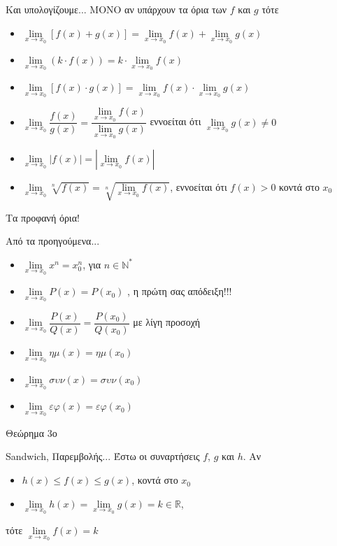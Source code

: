 \documentclass{presentation}
\begin{document}
\begin{frame}{Και υπολογίζουμε...}
  ΜΟΝΟ αν υπάρχουν τα όρια των $f$ και $g$ τότε
  \begin{itemize}
    \item $\lim\limits_{x \to x_0}{ \left[ f(x)+g(x) \right] }=\lim\limits_{x \to x_0}{ f(x) }+\lim\limits_{x \to x_0}{ g(x) }$
    \item $\lim\limits_{x \to x_0}{ \left( k\cdot f(x) \right) }=k\cdot \lim\limits_{x \to x_0}{ f(x) }$
    \item $\lim\limits_{x \to x_0}{ \left[ f(x)\cdot g(x) \right]}=\lim\limits_{x \to x_0}{ f(x) }\cdot\lim\limits_{x \to x_0}{ g(x) }$
    \item $\lim\limits_{x \to x_0}{ \dfrac{f(x)}{g(x)} }=\dfrac{\lim\limits_{x \to x_0}{ f(x) }}{\lim\limits_{x \to x_0}{ g(x) }}$ εννοείται ότι $\lim\limits_{x \to x_0}{ g(x) }\ne 0$
    \item $\lim\limits_{x \to x_0}{ |f(x)| }=|\lim\limits_{x \to x_0}{ f(x) }|$
    \item $\lim\limits_{x \to x_0}{ \sqrt[n]{f(x)} }=\sqrt[n]{\lim\limits_{x \to x_0}{ f(x) }}$, εννοείται ότι $f(x)>0$ κοντά στο $x_0$
  \end{itemize}
\end{frame}

\begin{frame}{Τα προφανή όρια!}
  \begin{block}{Από τα προηγούμενα...}
    \begin{itemize}
      \item $\lim\limits_{x \to x_0}{ x^n }=x_0^n$, για $n\in \mathbb{N}^*$ \pause
      \item $\lim\limits_{x \to x_0}{ P(x) }=P(x_0)$ \pause, η πρώτη σας απόδειξη!!! \pause
      \item $\lim\limits_{x \to x_0}{ \dfrac{P(x)}{Q(x)} }=\dfrac{P(x_0)}{Q(x_0)}$ \pause με λίγη προσοχή \pause
      \item $\lim\limits_{x \to x_0}{ ημ(x) }=ημ(x_0)$ \pause
      \item $\lim\limits_{x \to x_0}{ συν(x) }=συν(x_0)$ \pause
      \item $\lim\limits_{x \to x_0}{ εφ(x) }=εφ(x_0)$
    \end{itemize}
  \end{block}
\end{frame}

\begin{frame}{Θεώρημα 3ο}
  \begin{block}{Sandwich, Παρεμβολής...}
    Έστω οι συναρτήσεις $f$, $g$ και $h$. Αν
    \begin{itemize}
      \item<1-> $h(x)\le f(x) \le g(x)$, κοντά στο $x_0$
      \item<2-> $\lim\limits_{x \to x_0}{ h(x) }=\lim\limits_{x \to x_0}{ g(x) }=k \in\mathbb{R}$,
    \end{itemize}
    τότε $\lim\limits_{x \to x_0}{ f(x) }=k$
  \end{block}
\end{frame}
\end{document}
